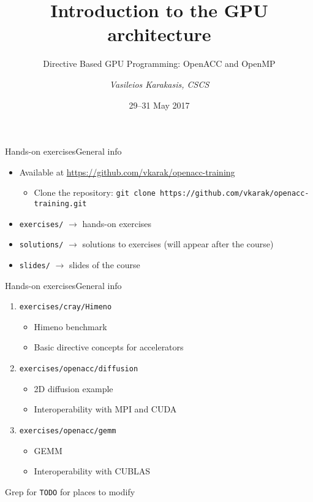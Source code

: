 \documentclass[aspectratio=169,12pt]{beamer}
\author{\emph{Vasileios Karakasis, CSCS}}
\title{Introduction to the GPU architecture}
\subtitle{Directive Based GPU Programming: OpenACC and OpenMP}
\date{29--31 May 2017}
\newcommand\shinline[2][]{\lstinline[style=shstyle,basicstyle=\ttfamily,#1]!#2!}
\begin{document}
\cscstitle

\begin{frame}[fragile]{Hands-on exercises}{General info}
  \begin{itemize}
  \item Available at \url{https://github.com/vkarak/openacc-training}
    \begin{itemize}
    \item Clone the repository: \shinline{git clone https://github.com/vkarak/openacc-training.git}
    \end{itemize}
  \item \shinline{exercises/} $\rightarrow$ hands-on exercises
  \item \shinline{solutions/} $\rightarrow$ solutions to exercises (will appear after the course)
  \item \shinline{slides/} $\rightarrow$ slides of the course
  \end{itemize}
\end{frame}

\begin{frame}[fragile]{Hands-on exercises}{General info}
  \begin{enumerate}
  \item \shinline{exercises/cray/Himeno}
    \begin{itemize}
    \item Himeno benchmark
    \item Basic directive concepts for accelerators
    \end{itemize}
  \item \shinline{exercises/openacc/diffusion}
    \begin{itemize}
    \item 2D diffusion example
    \item Interoperability with MPI and CUDA
    \end{itemize}
  \item \shinline{exercises/openacc/gemm}
    \begin{itemize}
    \item GEMM
    \item Interoperability with CUBLAS
    \end{itemize}
  \end{enumerate}
  \vfill
  Grep for \texttt{TODO} for places to modify
\end{frame}
\end{document}
